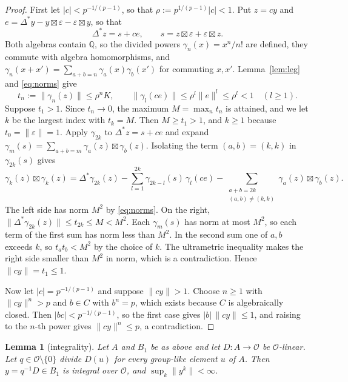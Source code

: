 \documentclass[11pt]{article}
\newtheorem{lemma}[theorem]{Lemma}
\theoremstyle{definition}
\theoremstyle{remark}
\newcommand{\cO}{\mathcal O}
\begin{document}
\begin{proof}
First let $\lvert c\rvert<p^{-1/(p-1)}$, so that $\rho:=p^{1/(p-1)}\lvert c\rvert<1$. Put $z=cy$ and $e=\Delta^*y-y\boxtimes\varepsilon-\varepsilon\boxtimes y$, so that
\[
\Delta^*z=s+ce,\qquad s=z\boxtimes\varepsilon+\varepsilon\boxtimes z .
\]
Both algebras contain $\mathbb Q$, so the divided powers $\gamma_n(x)=x^n/n!$ are defined, they commute with algebra homomorphisms, and $\gamma_n(x+x')=\sum_{a+b=n}\gamma_a(x)\gamma_b(x')$ for commuting $x,x'$. Lemma~\ref{lem:leg} and \eqref{eq:norms} give
\[
t_n:=\lVert\gamma_n(z)\rVert\le\rho^nK,\qquad\lVert\gamma_l(ce)\rVert\le\rho^l\lVert e\rVert^l\le\rho^l<1\quad(l\ge1).
\]
Suppose $t_1>1$. Since $t_n\to0$, the maximum $M=\max_nt_n$ is attained, and we let $k$ be the largest index with $t_k=M$. Then $M\ge t_1>1$, and $k\ge1$ because $t_0=\lVert\varepsilon\rVert=1$. Apply $\gamma_{2k}$ to $\Delta^*z=s+ce$ and expand $\gamma_m(s)=\sum_{a+b=m}\gamma_a(z)\boxtimes\gamma_b(z)$. Isolating the term $(a,b)=(k,k)$ in $\gamma_{2k}(s)$ gives
\[
\gamma_k(z)\boxtimes\gamma_k(z)=\Delta^*\gamma_{2k}(z)-\sum_{l=1}^{2k}\gamma_{2k-l}(s)\,\gamma_l(ce)-\sum_{\substack{a+b=2k\\(a,b)\ne(k,k)}}\gamma_a(z)\boxtimes\gamma_b(z).
\]
The left side has norm $M^2$ by \eqref{eq:norms}. On the right, $\lVert\Delta^*\gamma_{2k}(z)\rVert\le t_{2k}\le M<M^2$. Each $\gamma_m(s)$ has norm at most $M^2$, so each term of the first sum has norm less than $M^2$. In the second sum one of $a,b$ exceeds $k$, so $t_at_b<M^2$ by the choice of $k$. The ultrametric inequality makes the right side smaller than $M^2$ in norm, which is a contradiction. Hence $\lVert cy\rVert=t_1\le1$.

Now let $\lvert c\rvert=p^{-1/(p-1)}$ and suppose $\lVert cy\rVert>1$. Choose $n\ge1$ with $\lVert cy\rVert^n>p$ and $b\in C$ with $b^n=p$, which exists because $C$ is algebraically closed. Then $\lvert bc\rvert<p^{-1/(p-1)}$, so the first case gives $\lvert b\rvert\,\lVert cy\rVert\le1$, and raising to the $n$-th power gives $\lVert cy\rVert^n\le p$, a contradiction.
\end{proof}

\begin{lemma}[integrality]\label{lem:int}
Let $A$ and $B_1$ be as above and let $D\colon A\to\cO$ be $\cO$-linear. Let $q\in\cO\setminus\{0\}$ divide $D(u)$ for every group-like element $u$ of $A$. Then $y=q^{-1}D\in B_1$ is integral over $\cO$, and $\sup_k\lVert y^k\rVert<\infty$.
\end{lemma}
\end{document}
